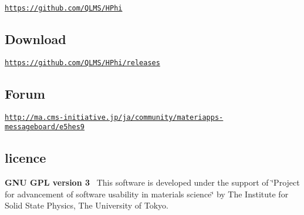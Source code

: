 \href{https://github.com/QLMS/HPhi}{\tt https\+://github.\+com/\+Q\+L\+M\+S/\+H\+Phi} 

 \subsection*{Download}

\href{https://github.com/QLMS/HPhi/releases}{\tt https\+://github.\+com/\+Q\+L\+M\+S/\+H\+Phi/releases} 

 \subsection*{Forum}

\href{http://ma.cms-initiative.jp/ja/community/materiapps-messageboard/e5hes9}{\tt http\+://ma.\+cms-\/initiative.\+jp/ja/community/materiapps-\/messageboard/e5hes9} 

 \subsection*{licence}

{\bfseries G\+N\+U G\+P\+L version 3}~\newline
This software is developed under the support of \char`\"{}\+Project for advancement of software usability in materials science\char`\"{} by The Institute for Solid State Physics, The University of Tokyo.~\newline
